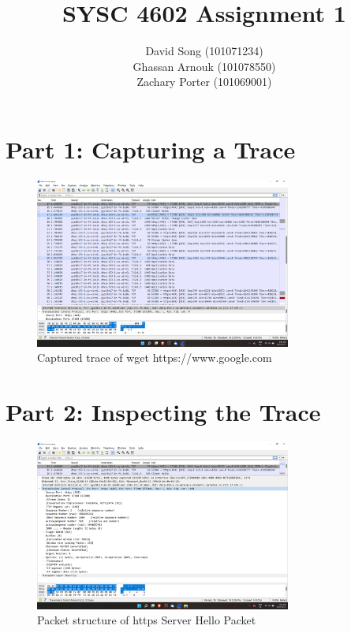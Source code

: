 \documentclass{article}
\begin{document}
    \title  { \textbf{SYSC 4602 Assignment 1} }
    \author {
        David Song (101071234)\\
        Ghassan Arnouk (101078550)\\
        Zachary Porter (101069001)
    }
     
    \maketitle
    
    \clearpage

    \section*{Part 1: Capturing a Trace}
    \begin{figure}[htbp]
        \centering
        \includegraphics[width=0.75\textwidth]{images/trace-https.png}
        \caption{Captured trace of wget https://www.google.com}
    \end{figure}

    \section*{Part 2: Inspecting the Trace}
    \begin{figure}[htbp]
        \centering
        \includegraphics[width=0.75\textwidth]{images/https-server-hello-structure-1.png}
        \caption{Packet structure of https Server Hello Packet}
    \end{figure}
    \clearpage
\end{document}
